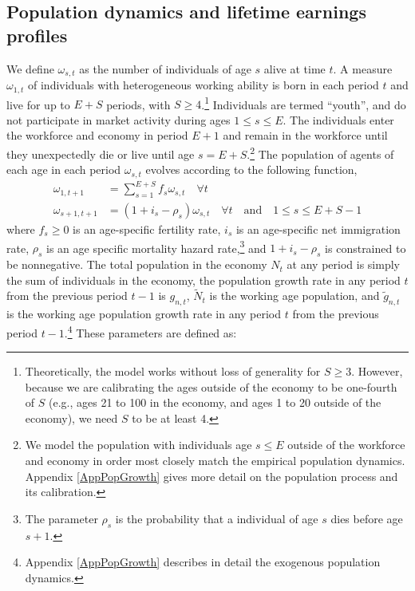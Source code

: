 \documentclass[letterpaper,12pt]{article}
\theoremstyle{definition}
\begin{document}
\begin{spacing}{1.5}
  \subsection{Population dynamics and lifetime earnings profiles}\label{SecPopDyn}

    We define $\omega_{s,t}$ as the number of individuals of age $s$ alive at time $t$. A measure $\omega_{1,t}$ of individuals with heterogeneous working ability is born in each period $t$ and live for up to $E+S$ periods, with $S\geq 4$.\footnote{Theoretically, the model works without loss of generality for $S\geq 3$. However, because we are calibrating the ages outside of the economy to be one-fourth of $S$ (e.g., ages 21 to 100 in the economy, and ages 1 to 20 outside of the economy), we need $S$ to be at least 4.} Individuals are termed ``youth'', and do not participate in market activity during ages $1\leq s\leq E$. The individuals enter the workforce and economy in period $E+1$ and remain in the workforce until they unexpectedly die or live until age $s=E+S$.\footnote{We model the population with individuals age $s\leq E$ outside of the workforce and economy in order most closely match the empirical population dynamics. Appendix \ref{AppPopGrowth} gives more detail on the population process and its calibration.} The population of agents of each age in each period $\omega_{s,t}$ evolves according to the following function,
    \begin{equation}\label{EqPopLawofmotion}
      \begin{split}
        \omega_{1,t+1} &= \sum_{s=1}^{E+S} f_s\omega_{s,t}\quad\forall t \\
        \omega_{s+1,t+1} &= (1 + i_s - \rho_s)\omega_{s,t}\quad\forall t\quad\text{and}\quad 1\leq s \leq E+S-1
      \end{split}
    \end{equation}
    where $f_s\geq 0$ is an age-specific fertility rate, $i_s$ is an age-specific net immigration rate, $\rho_s$ is an age specific mortality hazard rate,\footnote{The parameter $\rho_s$ is the probability that a individual of age $s$ dies before age $s+1$.} and $1+i_s-\rho_s$ is constrained to be nonnegative. The total population in the economy $N_t$ at any period is simply the sum of individuals in the economy, the population growth rate in any period $t$ from the previous period $t-1$ is $g_{n,t}$, $\tilde{N}_t$ is the working age population, and $\tilde{g}_{n,t}$ is the working age population growth rate in any period $t$ from the previous period $t-1$.\footnote{Appendix \ref{AppPopGrowth} describes in detail the exogenous population dynamics.} These parameters are defined as:

\end{spacing}
\end{document}
